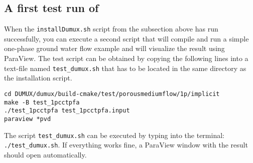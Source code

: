 \subsection{A first test run of \Dumux}
When the \texttt{installDumux.sh} script from the subsection above has run successfully, you can execute a second script that
will compile and run a simple one-phase ground water flow example and will visualize the result using ParaView.
The test script can be obtained by copying the following lines into a text-file named \texttt{test\_dumux.sh}
that has to be located in the same directory as the installation script.
\begin{lstlisting}[style=DumuxCode]
cd DUMUX/dumux/build-cmake/test/porousmediumflow/1p/implicit
make -B test_1pcctpfa
./test_1pcctpfa test_1pcctpfa.input
paraview *pvd
\end{lstlisting}
The script \texttt{test\_dumux.sh} can be executed by typing into the terminal: \texttt{./test\_dumux.sh}.
If everything works fine, a ParaView window with the result should open automatically.
